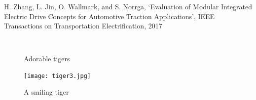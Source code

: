 H. Zhang, L. Jin, O. Wallmark, and S. Norrga, ‘Evaluation of Modular Integrated Electric Drive Concepts for Automotive Traction Applications’, IEEE Transactions on Transportation Electrification, 2017

\begin{figure}[tbp]
\begin{minipage}{0.45\textwidth}
\centering
{}\\
   \caption{ \label{fig:classD_rect_sch}Adorable tigers}
   \vspace{-10pt}
\end{minipage}
\qquad
\begin{minipage}{0.45\textwidth}
    \centering
    \texttt{[image: tiger3.jpg]}
     \caption{ \label{fig:classD_rect_analysis}A smiling tiger}
     \vspace{-10pt}
\end{minipage}
\end{figure}



